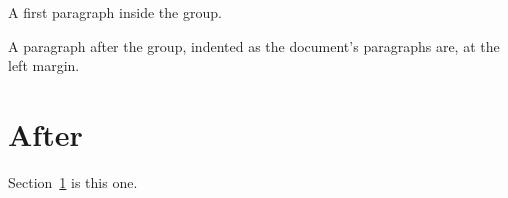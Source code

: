 \documentclass{article}
\begin{document}
\begingroup\leftskip=50pt\noindent A first paragraph inside the group.\par\leftskip=70pt\endgroup
A paragraph after the group, indented as the document's paragraphs are, at the left margin.
\section{After}\label{after}
Section~\ref{after} is this one.
\end{document}
